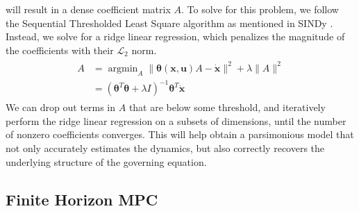 \documentclass[10pt,twocolumn]{article}
\DeclareMathOperator*{\argmin}{argmin}
\begin{document}
will result in a dense coefficient matrix $A$. To solve for this problem, we follow
the Sequential Thresholded Least Square algorithm as mentioned in SINDy \cite{sindy}.
Instead, we solve for a ridge linear regression, which penalizes the magnitude of the coefficients
with their $\mathcal{L}_2$ norm.
\begin{gather}\label{eqa:ridge_regression}
  \begin{aligned}
    A &= \argmin_A \| \bm{\theta}(\bm{x}, \bm{u})A - \dot{\bm{x}} \|^2 + \lambda \| A \|^2 \\
      &= (\bm{\theta}^T \bm{\theta} + \lambda I)^{-1}\bm{\theta}^T \dot{\bm{x}}
  \end{aligned}
\end{gather}
We can drop out terms in $A$ that are below some threshold, and iteratively perform the
ridge linear regression on a subsets of dimensions, until the number of nonzero coefficients
converges. This will help obtain a parsimonious model that not only accurately estimates the
dynamics, but also correctly recovers the underlying structure of the governing equation.

\subsection{Finite Horizon MPC}\label{sec:mpc}
\end{document}

